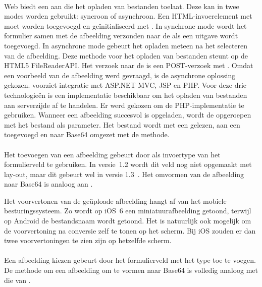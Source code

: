 \paragraph{\kendo}
\kendo{} Web biedt een  aan die het opladen van bestanden toelaat.
Deze  kan in twee modes worden gebruikt: syncroon of asynchroon.
Een HTML-invoerelement met  moet worden toegevoegd en geïnitialiseerd met .
In synchrone mode wordt het formulier samen met de afbeelding verzonden naar de  als een uitgave wordt toegevoegd.
In asynchrone mode gebeurt het opladen meteen na het selecteren van de afbeelding.
Deze methode voor het opladen van bestanden steunt op de HTML5 FileReaderAPI.
Het verzoek naar de  is een POST-verzoek met  .
Omdat een voorbeeld van de afbeelding werd gevraagd, is de asynchrone oplossing gekozen.	
\kendo{} voorziet integratie met ASP.NET MVC,  JSP en PHP.
Voor deze drie technologieën is een implementatie beschikbaar om het opladen van bestanden aan serverzijde af te handelen.
Er werd gekozen om de PHP-implementatie te gebruiken.
Wanneer een afbeelding succesvol is opgeladen, wordt de  opgeroepen met het bestand als parameter.
Het bestand wordt met een  gelezen,  aan een  toegevoegd en naar Base64 omgezet met de  methode.

\paragraph{\jqm}
Het toevoegen van een afbeelding gebeurt door  als invoertype van het formulierveld te gebruiken. 
In versie~1.2 wordt dit veld nog niet opgemaakt met lay-out, maar dit gebeurt wel in versie 1.3~\cite{JQuery2013d}. 
Het omvormen van de afbeelding naar Base64 is analoog aan \kendo{}.

Het voorvertonen van de geüploade afbeelding hangt af van het mobiele besturingssysteem.
Zo wordt op iOS~6 een miniatuurafbeelding getoond, terwijl op Android de bestandsnaam wordt getoond.
Het is natuurlijk ook mogelijk om de voorvertoning na conversie zelf te tonen op het scherm.
Bij iOS zouden er dan twee voorvertoningen te zien zijn op hetzelfde scherm.

\paragraph{\lungo}
Een afbeelding kiezen gebeurt door het formulierveld met het type  toe te voegen.
De methode om een afbeelding om te vormen naar Base64 is volledig analoog met die van \kendo{}.

